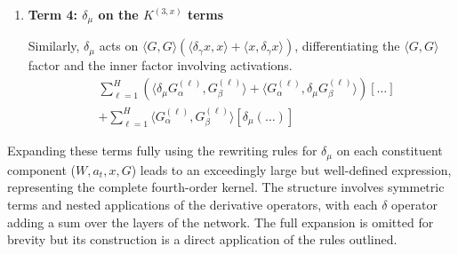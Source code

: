 \documentclass[11pt,a4paper]{article}
\theoremstyle{definition}
\begin{document}
\begin{enumerate}
    Here, $\delta_\mu$ acts on the term structure $\langle \dots \rangle \left( \langle \delta_\gamma G, G \rangle + \langle G, \delta_\gamma G \rangle \right)$. This involves differentiating the outer product of activations $\langle x^{(\ell-1)}_\alpha, x^{(\ell-1)}_\beta \rangle$ and the inner products of backpropagated vectors.
    \begin{align}
    & \sum_{\ell=1}^{H} \left( \langle \delta_\mu x^{(\ell-1)}_\alpha, x^{(\ell-1)}_\beta \rangle + \langle x^{(\ell-1)}_\alpha, \delta_\mu x^{(\ell-1)}_\beta \rangle \right) \left[ \dots \right] \nonumber \\
    & + \sum_{\ell=1}^{H} \langle x^{(\ell-1)}_\alpha, x^{(\ell-1)}_\beta \rangle \left[ \delta_\mu(\dots) \right]
    \end{align}
    where the bracket contains the full expression from $K^{(3,G)}$. For example, a term $\langle \delta_\gamma G^{(\ell)}_\alpha, G^{(\ell)}_\beta \rangle$ becomes $\langle \delta_\mu(\delta_\gamma G^{(\ell)}_\alpha), G^{(\ell)}_\beta \rangle + \langle \delta_\gamma G^{(\ell)}_\alpha, \delta_\mu G^{(\ell)}_\beta \rangle$.

    \item \textbf{Term 4: $\delta_\mu$ on the $K^{(3, x)}$ terms}

    Similarly, $\delta_\mu$ acts on $\langle G, G \rangle \left( \langle \delta_\gamma x, x \rangle + \langle x, \delta_\gamma x \rangle \right)$, differentiating the $\langle G,G \rangle$ factor and the inner factor involving activations.
    \begin{align}
    & \sum_{\ell=1}^{H} \left( \langle \delta_\mu G^{(\ell)}_\alpha, G^{(\ell)}_\beta \rangle + \langle G^{(\ell)}_\alpha, \delta_\mu G^{(\ell)}_\beta \rangle \right) \left[ \dots \right] \nonumber \\
    & + \sum_{\ell=1}^{H} \langle G^{(\ell)}_\alpha, G^{(\ell)}_\beta \rangle \left[ \delta_\mu(\dots) \right]
    \end{align}
\end{enumerate}

Expanding these terms fully using the rewriting rules for $\delta_\mu$ on each constituent component ($W, a_t, x, G$) leads to an exceedingly large but well-defined expression, representing the complete fourth-order kernel. The structure involves symmetric terms and nested applications of the derivative operators, with each $\delta$ operator adding a sum over the layers of the network. The full expansion is omitted for brevity but its construction is a direct application of the rules outlined.
\end{document}
